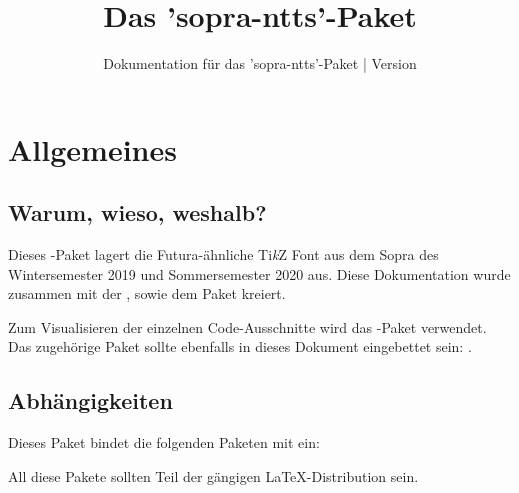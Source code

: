 \documentclass{sopra-base}
\title{Das 'sopra-ntts'-Paket}
\subtitle[Dokumentation für das 'sopra-ntts'-Paket]{Dokumentation für das 'sopra-ntts'-Paket | Version \thesonversion}
\begin{document}
    \maketitle

\section{Allgemeines}
\subsection{Warum, wieso, weshalb?}
    Dieses \LaTeXe-Paket lagert die Futura-ähnliche Ti\textit{k}Z Font aus dem Sopra des
    Wintersemester 2019 und Sommersemester 2020 aus.
    Diese Dokumentation wurde zusammen mit der
    , sowie dem Paket  kreiert.\par
    Zum Visualisieren der einzelnen Code-Ausschnitte wird das
    -Paket verwendet.
    Das zugehörige Paket sollte ebenfalls in dieses Dokument eingebettet sein: .
\subsection{Abhängigkeiten}
    Dieses Paket bindet die folgenden Paketen mit ein:
    \begin{multicols}{3}
    \end{multicols}
    All diese Pakete sollten Teil der gängigen \LaTeX-Distribution sein.
\end{document}
